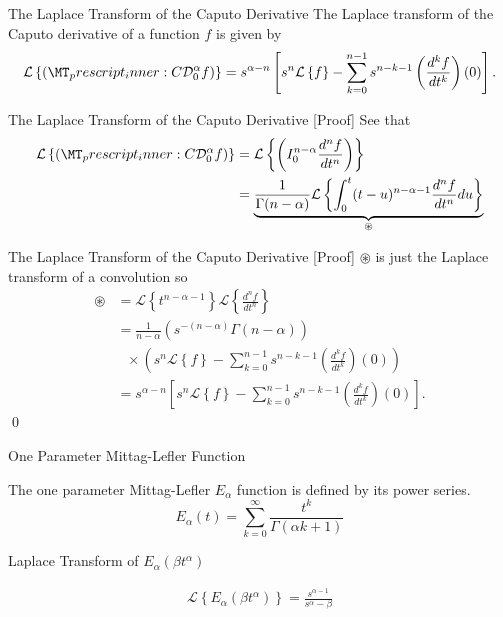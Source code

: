 \documentclass[pdf]{beamer}
\newcommand{\laplace}[1]{ \mathcal{L} \left\{ #1 \right\} }
\newcommand{\rli}[3]{ \left( I_{#1}^{#2} #3 \right) }
\newcommand{\der}[3]{ \frac{d^{#3}#1}{d#2^{#3}} }
\newcommand{\capder}[3]{ \left( \prescript{C}{}{\mathcal{D}_{#1}^{#2}} #3 \right) }
\begin{document}
\begin{frame}{The Laplace Transform of the Caputo Derivative}
	The Laplace transform of the Caputo derivative of  a function $ f $ is given by
	\begin{align*}
		\laplace{\capder{0}{\alpha}{f}} = s^{\alpha - n} \left[ s^n \laplace{f} - \sum_{k=0}^{n-1} s^{n-k-1} \left( \der{f}{t}{k} \right)(0) \right].
	\end{align*}
\end{frame}

\begin{frame}{The Laplace Transform of the Caputo Derivative [Proof]}
	See that
	\begin{align*}
		\laplace{\capder{0}{\alpha}{f}} &= \laplace{  \rli{0}{n-\alpha}{\der{f}{t}{n}}} \\
			&= \underbrace{\frac{1}{\Gamma(n-\alpha)}\laplace{ \int_0^t (t-u)^{n-\alpha-1} \der{f}{t}{n} du}}_{\circledast} \\ 
	\end{align*}
\end{frame}

\begin{frame}{The Laplace Transform of the Caputo Derivative [Proof]}
	$ \circledast $ is just the Laplace transform of a convolution so 
	\begin{align*}
		\circledast &= \laplace{t^{n-\alpha-1}} \laplace{\der{f}{t}{n}} \\
		&= \frac{1}{n-\alpha} \left( s^{-(n-\alpha)} \Gamma(n-\alpha) \right) \\
		& \ \ \ \times \left( s^n \laplace{f} - \sum_{k=0}^{n-1} s^{n-k-1} \left( \der{f}{t}{k} \right)(0) \right) \\
		&= s^{\alpha - n} \left[ s^n \laplace{f} - \sum_{k=0}^{n-1} s^{n-k-1} \left( \der{f}{t}{k} \right)(0) \right].
	\end{align*}
	\qed
\end{frame}

\begin{frame}{One Parameter Mittag-Lefler Function}
	\begin{definition}
		The one parameter Mittag-Lefler $ E_\alpha $ function is defined by its power series.
		$$
			E_\alpha(t) = \sum_{k=0}^{\infty} \frac{t^k}{\Gamma(\alpha k + 1)}
		$$
	\end{definition}
\end{frame}

\begin{frame}{Laplace Transform of $E_\alpha(\beta t^\alpha)$}
	\begin{lemma}
		\begin{align*}	
			\laplace{ E_\alpha (\beta t^\alpha)} = \frac{s^{\alpha - 1}}{s^\alpha - \beta}
		\end{align*}
	\end{lemma}
\end{frame}
\end{document}
